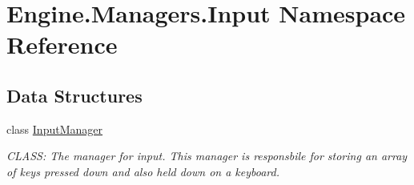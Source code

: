 \hypertarget{a00270}{}\section{Engine.\+Managers.\+Input Namespace Reference}
\label{a00270}
\subsection*{Data Structures}
\begin{DoxyCompactItemize}
\item 
class \hyperlink{a00522}{Input\+Manager}
\begin{DoxyCompactList}\small\item\em C\+L\+A\+SS\+: The manager for input. This manager is responsbile for storing an array of keys pressed down and also held down on a keyboard. \end{DoxyCompactList}\end{DoxyCompactItemize}
